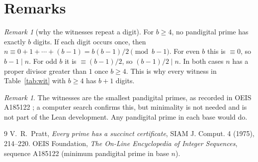 \documentclass[11pt]{article}
\theoremstyle{plain}
\theoremstyle{definition}
\theoremstyle{remark}
\newtheorem{remark}[theorem]{Remark}
\begin{document}
\section{Remarks}

\begin{remark}[why the witnesses repeat a digit]
For $b\ge4$, no pandigital prime has exactly $b$ digits. If each digit occurs
once, then $n\equiv0+1+\cdots+(b-1)=b(b-1)/2\pmod{b-1}$. For even $b$ this
is $\equiv0$, so $b-1\mid n$. For odd $b$ it is $\equiv(b-1)/2$, so
$(b-1)/2\mid n$. In both cases $n$ has a proper divisor greater than $1$
once $b\ge4$. This is why every witness in Table~\ref{tab:wit} with $b\ge4$
has $b+1$ digits.
\end{remark}

\begin{remark}
The witnesses are the smallest pandigital primes, as recorded in OEIS A185122 \cite{oeis};
a computer search confirms this, but minimality is not needed and is not part
of the Lean development. Any pandigital prime in each base would do.
\end{remark}

\begin{thebibliography}{9}
 V.~R.~Pratt, \emph{Every prime has a succinct certificate},
  SIAM J. Comput. 4 (1975), 214--220.
 OEIS Foundation, \emph{The On-Line Encyclopedia of Integer
  Sequences}, sequence A185122 (minimum pandigital prime in base $n$).
\end{thebibliography}
\end{document}
